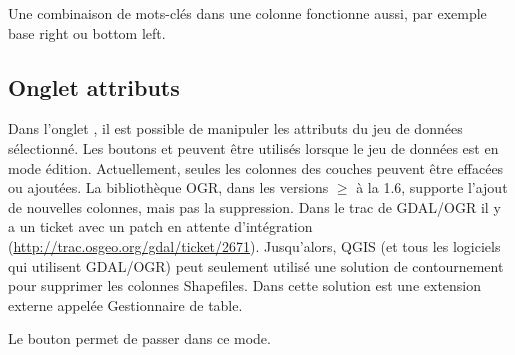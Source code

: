 Une combinaison de mots-clés dans une colonne fonctionne aussi, par exemple base 
right ou bottom left.

\subsection{Onglet attributs}\label{label_attributes}

Dans l'onglet , il est possible de manipuler les attributs du jeu 
de données sélectionné. Les boutons  et  peuvent 
être utilisés lorsque le jeu de données est en mode édition. Actuellement, 
seules les colonnes des couches \pg peuvent être effacées ou ajoutées. La 
bibliothèque OGR, dans les versions $\geq$ à la 1.6, supporte l'ajout de 
nouvelles colonnes, mais pas la suppression. Dans le trac de GDAL/OGR il y a un 
ticket avec un patch en attente d'intégration (\url{http://trac.osgeo.org/gdal/ticket/2671}). 
Jusqu'alors, QGIS (et tous les logiciels qui utilisent GDAL/OGR) peut seulement utilisé une solution de contournement pour supprimer les colonnes Shapefiles. 
Dans \qg cette solution est une extension externe appelée Gestionnaire de table.

Le bouton  permet de passer dans ce mode.


